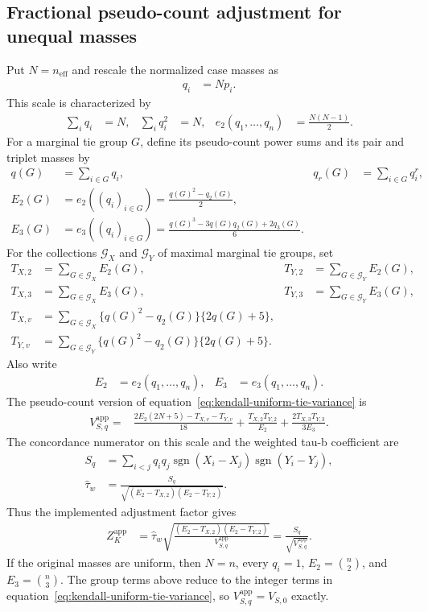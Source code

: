 \subsection{Fractional pseudo-count adjustment for unequal masses}

Put $N=n_{\mathrm{eff}}$ and rescale the normalized case masses as
\begin{align*}
 q_i
 &= Np_i.
\end{align*}
This scale is characterized by
\begin{align*}
 \sum_iq_i
 &=N,
 &
 \sum_iq_i^2
 &=N,
 &
 e_2(q_1,\ldots,q_n)
 &=\frac{N(N-1)}{2}.
\end{align*}
For a marginal tie group $G$, define its pseudo-count power sums and its pair
and triplet masses by
\begin{align*}
 q(G)
 &=\sum_{i\in G}q_i,
 &
 q_r(G)
 &=\sum_{i\in G}q_i^r,\\
 E_2(G)
 &=e_2((q_i)_{i\in G})
 =\frac{q(G)^2-q_2(G)}{2},\\
 E_3(G)
 &=e_3((q_i)_{i\in G})
 =\frac{q(G)^3-3q(G)q_2(G)+2q_3(G)}{6}.
\end{align*}
For the collections $\mathcal G_X$ and $\mathcal G_Y$ of maximal marginal
tie groups, set
\begin{align*}
 T_{X,2}
 &=\sum_{G\in\mathcal G_X}E_2(G),
 &
 T_{Y,2}
 &=\sum_{G\in\mathcal G_Y}E_2(G),\\
 T_{X,3}
 &=\sum_{G\in\mathcal G_X}E_3(G),
 &
 T_{Y,3}
 &=\sum_{G\in\mathcal G_Y}E_3(G),\\
 T_{X,v}
 &=\sum_{G\in\mathcal G_X}
 \{q(G)^2-q_2(G)\}\{2q(G)+5\},\\
 T_{Y,v}
 &=\sum_{G\in\mathcal G_Y}
 \{q(G)^2-q_2(G)\}\{2q(G)+5\}.
\end{align*}
Also write
\begin{align*}
 E_2
 &=e_2(q_1,\ldots,q_n),
 &
 E_3
 &=e_3(q_1,\ldots,q_n).
\end{align*}
The pseudo-count version of
equation~\eqref{eq:kendall-uniform-tie-variance} is
\begin{align}
 V_{S,q}^{\mathrm{app}}
 ={}&
 \frac{2E_2(2N+5)-T_{X,v}-T_{Y,v}}{18}
 +\frac{T_{X,2}T_{Y,2}}{E_2}
 +\frac{2T_{X,3}T_{Y,3}}{3E_3}.
 \label{eq:kendall-pseudocount-variance}
\end{align}
The concordance numerator on this scale and the weighted tau-b coefficient
are
\begin{align*}
 S_q
 &=\sum_{i<j}q_iq_j
 \operatorname{sgn}(X_i-X_j)\operatorname{sgn}(Y_i-Y_j),\\
 \widehat\tau_w
 &=\frac{S_q}{
 \sqrt{(E_2-T_{X,2})(E_2-T_{Y,2})}}.
\end{align*}
Thus the implemented adjustment factor gives
\begin{align}
 Z_K^{\mathrm{app}}
 &=\widehat\tau_w
 \sqrt{
 \frac{(E_2-T_{X,2})(E_2-T_{Y,2})}
 {V_{S,q}^{\mathrm{app}}}
 }
 =\frac{S_q}{\sqrt{V_{S,q}^{\mathrm{app}}}}.
 \label{eq:kendall-pseudocount-statistic}
\end{align}
If the original masses are uniform, then $N=n$, every $q_i=1$,
$E_2=\binom n2$, and $E_3=\binom n3$. The group terms above reduce to the
integer terms in equation~\eqref{eq:kendall-uniform-tie-variance}, so
$V_{S,q}^{\mathrm{app}}=V_{S,0}$ exactly.

